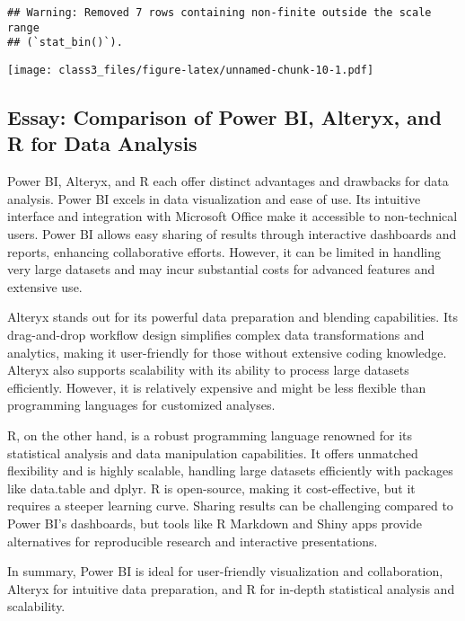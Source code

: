 \documentclass[
]{article}
\begin{document}
\begin{verbatim}
## Warning: Removed 7 rows containing non-finite outside the scale range
## (`stat_bin()`).
\end{verbatim}

\texttt{[image: class3\_files/figure-latex/unnamed-chunk-10-1.pdf]}

\subsection{Essay: Comparison of Power BI, Alteryx, and R for Data
Analysis}\label{essay-comparison-of-power-bi-alteryx-and-r-for-data-analysis}

Power BI, Alteryx, and R each offer distinct advantages and drawbacks
for data analysis. Power BI excels in data visualization and ease of
use. Its intuitive interface and integration with Microsoft Office make
it accessible to non-technical users. Power BI allows easy sharing of
results through interactive dashboards and reports, enhancing
collaborative efforts. However, it can be limited in handling very large
datasets and may incur substantial costs for advanced features and
extensive use.

Alteryx stands out for its powerful data preparation and blending
capabilities. Its drag-and-drop workflow design simplifies complex data
transformations and analytics, making it user-friendly for those without
extensive coding knowledge. Alteryx also supports scalability with its
ability to process large datasets efficiently. However, it is relatively
expensive and might be less flexible than programming languages for
customized analyses.

R, on the other hand, is a robust programming language renowned for its
statistical analysis and data manipulation capabilities. It offers
unmatched flexibility and is highly scalable, handling large datasets
efficiently with packages like data.table and dplyr. R is open-source,
making it cost-effective, but it requires a steeper learning curve.
Sharing results can be challenging compared to Power BI's dashboards,
but tools like R Markdown and Shiny apps provide alternatives for
reproducible research and interactive presentations.

In summary, Power BI is ideal for user-friendly visualization and
collaboration, Alteryx for intuitive data preparation, and R for
in-depth statistical analysis and scalability.
\end{document}
